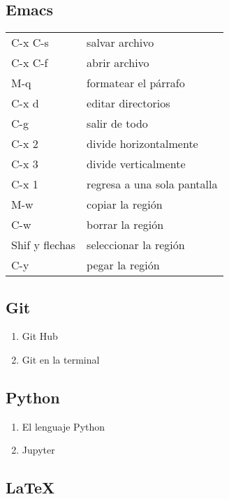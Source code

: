 \documentclass[11pt]{article}
\begin{document}
\subsection{Emacs}
\label{sec:org7917a3e}
\begin{center}
\begin{tabular}{ll}
C-x C-s & salvar archivo\\
C-x C-f & abrir archivo\\
M-q & formatear el párrafo\\
C-x d & editar directorios\\
C-g & salir de todo\\
C-x 2 & divide horizontalmente\\
C-x 3 & divide verticalmente\\
C-x 1 & regresa a una sola pantalla\\
M-w & copiar la región\\
C-w & borrar la región\\
Shif y flechas & seleccionar la región\\
C-y & pegar la región\\
\end{tabular}
\end{center}
\subsection{Git}
\label{sec:org959c919}
\begin{enumerate}
\item Git Hub
\label{sec:org666fff1}
\item Git en la terminal
\label{sec:orga84cf2d}
\end{enumerate}
\subsection{Python}
\label{sec:org7b7db00}
\begin{enumerate}
\item El lenguaje Python
\label{sec:org72d161e}
\item Jupyter
\label{sec:orgb9ca127}
\end{enumerate}
\subsection{\LaTeX{}}
\label{sec:orgc9d6be9}
\end{document}
